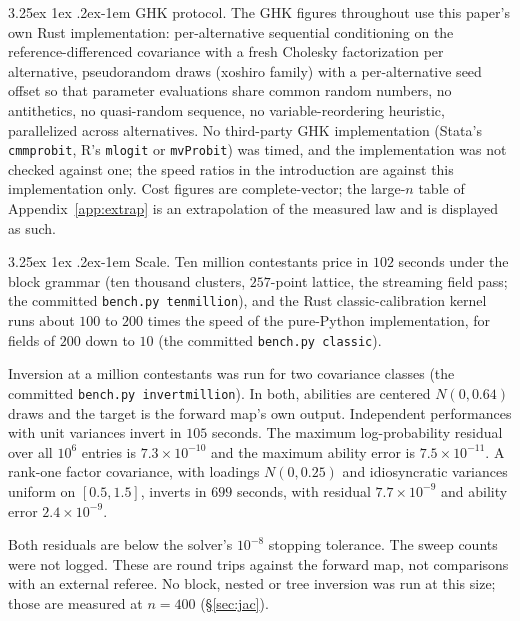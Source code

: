\documentclass[11pt]{article}
\makeatletter
\renewcommand\paragraph{\@startsection{paragraph}{4}{\z@}%
  {3.25ex \@plus1ex \@minus.2ex}{-1em}%
  {\normalfont\normalsize\itshape}}
\makeatother
\begin{document}
\paragraph{GHK protocol.} The GHK figures throughout use this paper's own
Rust implementation: per-alternative sequential conditioning on the
reference-differenced covariance with a fresh Cholesky factorization per
alternative, pseudorandom draws (xoshiro family) with a per-alternative
seed offset so that parameter evaluations share common random numbers, no
antithetics, no quasi-random sequence, no variable-reordering heuristic,
parallelized across alternatives. No third-party GHK implementation
(Stata's \texttt{cmmprobit}, R's \texttt{mlogit} or \texttt{mvProbit})
was timed, and the implementation was not checked against one; the
speed ratios in the introduction are against this
implementation only. Cost figures are complete-vector; the
large-$n$ table of Appendix~\ref{app:extrap} is an extrapolation of the measured
law and is displayed as such.

\paragraph{Scale.} Ten million contestants price in $102$ seconds under the
block grammar (ten thousand clusters, $257$-point lattice, the streaming
field pass; the committed \texttt{bench.py tenmillion}), and the Rust
classic-calibration kernel runs about $100$ to $200$ times the speed of
the pure-Python implementation, for fields of $200$ down to $10$ (the
committed \texttt{bench.py classic}).

Inversion at a million contestants was run for two covariance classes
(the committed \texttt{bench.py invertmillion}). In both, abilities are
centered $N(0,0.64)$ draws and the target is the forward map's own
output. Independent performances with unit variances invert in $105$
seconds. The maximum log-probability residual over all $10^{6}$ entries
is $7.3\times10^{-10}$ and the maximum ability error is
$7.5\times10^{-11}$. A rank-one factor covariance, with loadings
$N(0,0.25)$ and idiosyncratic variances uniform on $[0.5,1.5]$, inverts
in $699$ seconds, with residual $7.7\times10^{-9}$ and ability error
$2.4\times10^{-9}$.

Both residuals are below the solver's $10^{-8}$ stopping tolerance. The
sweep counts were not logged. These are round trips against the forward
map, not comparisons with an external referee. No block, nested or tree
inversion was run at this size; those are measured at $n=400$
(\S\ref{sec:jac}).
\end{document}

